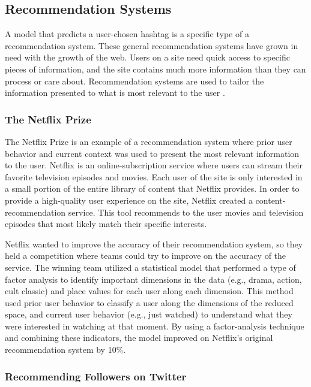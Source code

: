 \documentclass[man,floatsintext,donotrepeattitle]{apa6}
\begin{document}
\subsection{Recommendation Systems}

A model that predicts a user-chosen hashtag is a specific type of a recommendation system.
These general recommendation systems have grown in need with the growth of the web.
Users on a site need quick access to specific pieces of information, and the site contains much more information than they can process or care about.
Recommendation systems are used to tailor the information presented to what is most relevant to the user \parencite{Pazzani2007}.

\subsubsection{The Netflix Prize}

The Netflix Prize \parencite{Bennett2007} is an example of a recommendation system where prior user behavior and current context was used to present the most relevant information to the user.
Netflix is an online-subscription service where users can stream their favorite television episodes and movies.
Each user of the site is only interested in a small portion of the entire library of content that Netflix provides.
In order to provide a high-quality user experience on the site, Netflix created a content-recommendation service.
This tool recommends to the user movies and television episodes that most likely match their specific interests.

Netflix wanted to improve the accuracy of their recommendation system, so they held a competition where teams could try to improve on the accuracy of the service.
The winning team utilized a statistical model that performed a type of factor analysis to identify important dimensions in the data (e.g., drama, action, cult classic) and place values for each user along each dimension. 
This method used prior user behavior to classify a user along the dimensions of the reduced space, and current user behavior (e.g., just watched) to understand what they were interested in watching at that moment.
By using a factor-analysis technique and combining these indicators, the model improved on Netflix's original recommendation system by 10\%.

\subsubsection{Recommending Followers on Twitter}
\end{document}
